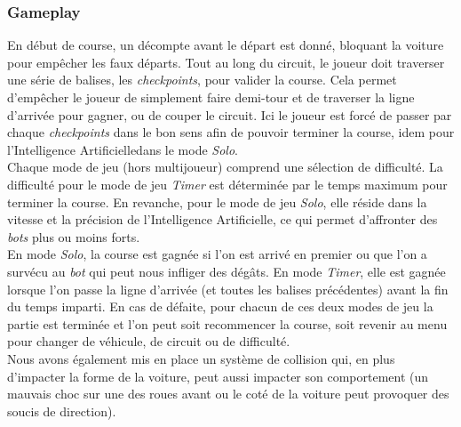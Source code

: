 \documentclass[a4paper,12pt]{article}
\newcommand{\AI}{Intelligence Artificielle}
\begin{document}
            \subsubsection{Gameplay}
                En début de course, un décompte avant le départ est donné, bloquant la voiture pour
                empêcher les faux départs. Tout au long du circuit, le joueur doit traverser une série de 
                balises, les \textit{checkpoints}, pour valider la course. Cela permet d'empêcher le 
                joueur de simplement faire demi-tour et de traverser la ligne d'arrivée pour gagner, ou
                de couper le circuit. Ici le joueur est forcé de passer par chaque \textit{checkpoints}
                dans le bon sens afin de pouvoir terminer la course,
                idem pour l'\AI dans le mode \textsl{Solo}.\\
                Chaque mode de jeu (hors multijoueur) comprend une sélection de difficulté.
                La difficulté pour le mode de jeu \textsl{Timer} est déterminée par le temps maximum pour 
                terminer la course. En revanche, pour le mode de jeu \textsl{Solo}, 
                elle réside dans la vitesse et la précision de l'\AI, ce qui permet d'affronter des 
                \textit{bots} plus ou moins forts. \\
                En mode \textsl{Solo}, la course est gagnée si l'on est arrivé en premier ou que l'on a 
                survécu au \textit{bot} qui peut nous infliger des dégâts. En mode \textsl{Timer}, elle 
                est gagnée lorsque l'on passe la ligne d'arrivée (et toutes les balises précédentes) avant
                la fin du temps imparti. En cas de défaite, pour chacun de ces deux modes de jeu la partie
                est terminée et l'on peut soit recommencer la course, soit revenir au menu pour changer de
                véhicule, de circuit ou de difficulté.\\
                Nous avons également mis en place un système de collision qui, en plus d'impacter la forme de 
                la voiture, peut aussi impacter son comportement (un mauvais choc sur une des roues avant ou 
                le coté de la voiture peut provoquer des soucis de direction).
\end{document}
